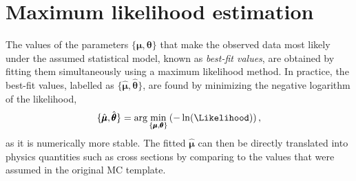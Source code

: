 
\section{Maximum likelihood estimation}
The values of the parameters $\{\pmb{\mu}, \pmb{\theta} \}$ that make the observed data most likely under the assumed statistical model, known as \emph{best-fit values}, are obtained by fitting them simultaneously using a maximum likelihood method.
In practice, the best-fit values, labelled as $\{\hat{\pmb{\mu}}, \hat{\pmb{\theta}} \}$, are found by minimizing the negative logarithm of the likelihood,
\begin{equation}
    \label{eq:best-fit-values}
    \{\hat{\pmb{\mu}}, \hat{\pmb{\theta}} \} = \text{arg} \min_{\{\pmb{\mu}, \pmb{\theta}\}} \left( - \ln (\Likelihood) \right),
\end{equation}
as it is numerically more stable.
The fitted $\hat{\pmb{\mu}}$ can then be directly translated into physics quantities such as cross sections by comparing to the values that were assumed in the original MC template.



